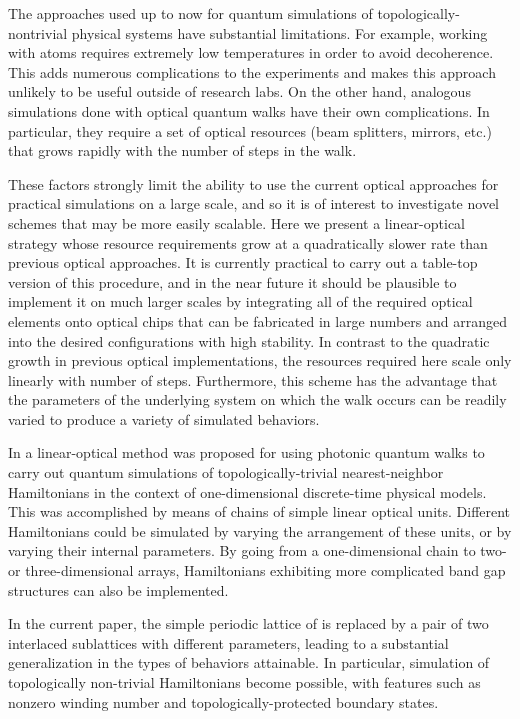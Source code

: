 \documentclass[twocolumn,amsmath, amssymb, superscriptaddress, pra]{revtex4}
\begin{document}
The approaches used up to now for quantum simulations of topologically-nontrivial physical systems have substantial limitations. For example, working with atoms
requires extremely low temperatures in order to avoid decoherence. This adds numerous complications to the experiments and makes this approach unlikely to be
useful outside of research labs. On the other hand, analogous simulations done with optical quantum walks have their own complications. In particular, they
require a set of optical resources (beam splitters, mirrors, etc.) that grows rapidly with the number of steps in the walk.

These factors strongly limit the ability to use the current optical approaches for practical simulations on a large scale, and so it is of interest to
investigate novel schemes that may be more easily scalable. Here we present a linear-optical strategy whose resource requirements grow at a quadratically slower
rate than previous optical approaches. It is currently practical to carry out a table-top version of this procedure, and in the near future it should be
plausible to implement it on much larger scales by integrating all of the required optical elements onto optical chips that can be fabricated in large numbers
and arranged into the desired configurations with high stability. In contrast to the quadratic growth in previous optical implementations, the resources required
here  scale only linearly with number of steps.   Furthermore, this scheme has the advantage that the parameters of the underlying system on which the walk
occurs can be readily varied to produce a variety of simulated behaviors.

In \cite{simham} a linear-optical method was proposed for using photonic quantum walks to carry out quantum simulations of topologically-trivial nearest-neighbor
Hamiltonians in the context of one-dimensional discrete-time physical models. This was accomplished by means of chains of simple linear optical units. Different
Hamiltonians could be simulated by varying the arrangement of these units, or by varying their internal parameters. By going from a one-dimensional chain to two-
or three-dimensional arrays,  Hamiltonians exhibiting more complicated band gap structures can also be implemented.

In the current paper, the simple periodic lattice of \cite{simham} is replaced by a pair of two interlaced sublattices with different parameters, leading to a
substantial generalization in the types of behaviors attainable. In particular, simulation of topologically non-trivial Hamiltonians become possible, with
features such as nonzero winding number and topologically-protected boundary states.
\end{document}
